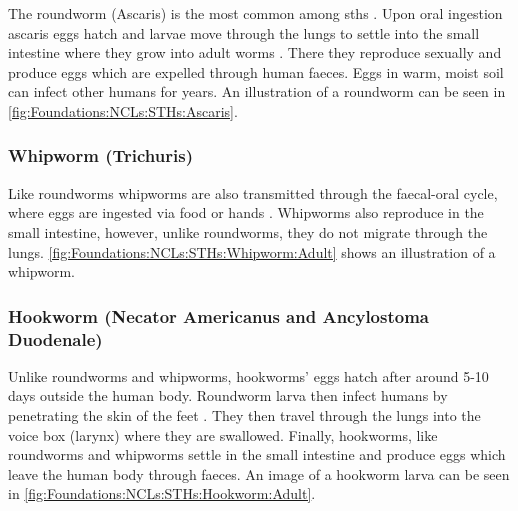 The roundworm (Ascaris) is the most common among \acp{sth} \cite{jamison2006helminth}. Upon oral ingestion ascaris eggs hatch and larvae move through the lungs to settle into the small intestine where they grow into adult worms \cite{jourdan2018soiltransmitted}. There they reproduce sexually and produce eggs which are expelled through human faeces. Eggs in warm, moist soil can infect other humans for years. An illustration of a roundworm can be seen in \autoref{fig:Foundations:NCLs:STHs:Ascaris}.

\subsubsection{Whipworm (Trichuris)}
\label{sec:Foundations:NTDs:STHs:Whipworm}

Like roundworms whipworms are also transmitted through the faecal-oral cycle, where eggs are ingested via food or hands \cite{jourdan2018soiltransmitted}. Whipworms also reproduce in the small intestine, however, unlike roundworms, they do not migrate through the lungs. \autoref{fig:Foundations:NCLs:STHs:Whipworm:Adult} shows an illustration of a whipworm.

\subsubsection{Hookworm (Necator Americanus and Ancylostoma Duodenale)}
\label{sec:Foundations:NTDs:STHs:Hookworm}

Unlike roundworms and whipworms, hookworms' eggs hatch after around 5-10 days outside the human body. Roundworm larva then infect humans by penetrating the skin of the feet \cite{jourdan2018soiltransmitted}. They then travel through the lungs into the voice box (larynx) where they are swallowed. Finally, hookworms, like roundworms and whipworms settle in the small intestine and produce eggs which leave the human body through faeces. An image of a hookworm larva can be seen in \autoref{fig:Foundations:NCLs:STHs:Hookworm:Adult}.

